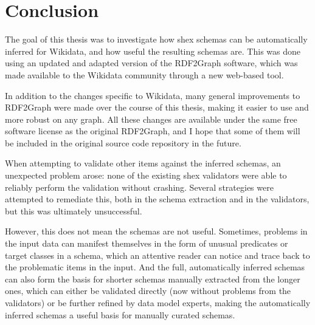 
\chapter{Conclusion}
\label{ch:Conclusion}

The goal of this thesis was to investigate how \gls{shex} schemas can be automatically inferred for Wikidata,
and how useful the resulting schemas are.
This was done using an updated and adapted version of the RDF2Graph software,
which was made available to the Wikidata community
through a new web-based tool.

In addition to the changes specific to Wikidata,
many general improvements to RDF2Graph were made over the course of this thesis,
making it easier to use and more robust on any graph.
All these changes are available under the same free software license as the original RDF2Graph,
and I hope that some of them will be included in the original source code repository in the future.

When attempting to validate other items against the inferred schemas,
an unexpected problem arose:
none of the existing \gls{shex} validators were able to reliably perform the validation without crashing.
Several strategies were attempted to remediate this,
both in the schema extraction and in the validators,
but this was ultimately unsuccessful.

However, this does not mean the schemas are not useful.
Sometimes, problems in the input data can manifest themselves
in the form of unusual predicates or target classes in a schema,
which an attentive reader can notice and trace back to the problematic items in the input.
And the full, automatically inferred schemas
can also form the basis for shorter schemas manually extracted from the longer ones,
which can either be validated directly
(now without problems from the validators)
or be further refined by data model experts, %
making the automatically inferred schemas a useful basis for manually curated schemas.

